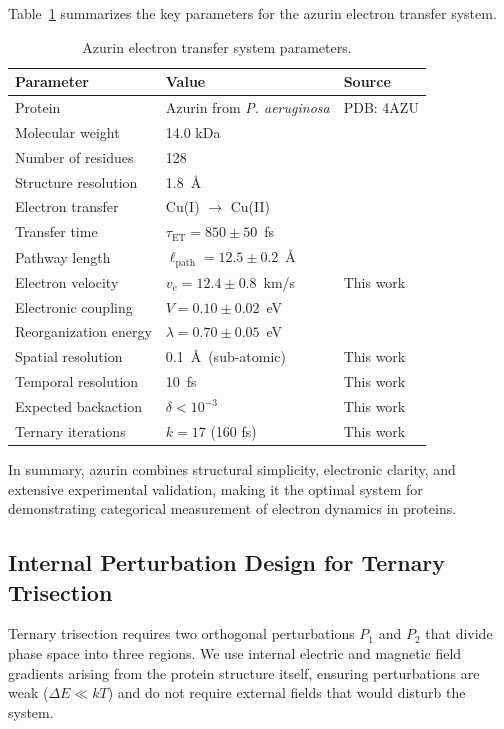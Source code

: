 \documentclass[twocolumn,10pt]{article}
\begin{document}
Table~\ref{tab:system_parameters} summarizes the key parameters for the azurin 
electron transfer system.

\begin{table}[h]
\centering
\caption{Azurin electron transfer system parameters.}
\label{tab:system_parameters}
\begin{tabular}{@{}lll@{}}
\toprule
Parameter & Value & Source \\
\midrule
Protein & Azurin from \textit{P. aeruginosa} & PDB: 4AZU \\
Molecular weight & 14.0 kDa & \cite{Nar1991} \\
Number of residues & 128 & \cite{Adman1978} \\
Structure resolution & 1.8~\AA & \cite{Nar1991} \\
\midrule
Electron transfer & Cu(I) $\to$ Cu(II) & \\
Transfer time & $\tau_{\text{ET}} = 850 \pm 50$~fs & \cite{Crane2001} \\
Pathway length & $\ell_{\text{path}} = 12.5 \pm 0.2$~\AA & \cite{Beratan1992} \\
Electron velocity & $v_e = 12.4 \pm 0.8$~km/s & This work \\
Electronic coupling & $V = 0.10 \pm 0.02$~eV & \cite{Gray2005} \\
Reorganization energy & $\lambda = 0.70 \pm 0.05$~eV & \cite{Winkler1997} \\
\midrule
Spatial resolution & 0.1~\AA\ (sub-atomic) & This work \\
Temporal resolution & 10~fs & This work \\
Expected backaction & $\delta < 10^{-3}$ & This work \\
Ternary iterations & $k = 17$ (160 fs) & This work \\
\bottomrule
\end{tabular}
\end{table}

In summary, azurin combines structural simplicity, electronic clarity, and 
extensive experimental validation, making it the optimal system for demonstrating 
categorical measurement of electron dynamics in proteins.

\subsection{Internal Perturbation Design for Ternary Trisection}

Ternary trisection requires two orthogonal perturbations $P_1$ and $P_2$ that 
divide phase space into three regions. We use internal electric and magnetic 
field gradients arising from the protein structure itself, ensuring perturbations 
are weak ($\Delta E \ll kT$) and do not require external fields that would 
disturb the system.
\end{document}
